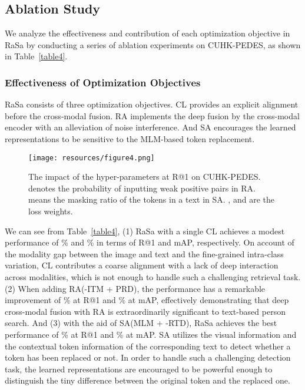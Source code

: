 \documentclass{article}
\begin{document}
\subsection{Ablation Study}


We analyze the effectiveness and contribution of each optimization objective in RaSa by conducting a series of ablation experiments on CUHK-PEDES, as shown in Table~\ref{table4}.


\subsubsection{Effectiveness of Optimization Objectives}
RaSa consists of three optimization objectives. CL provides an explicit alignment before the cross-modal fusion. RA implements the deep fusion by the cross-modal encoder with an alleviation of noise interference. And SA encourages the learned representations to be sensitive to the MLM-based token replacement.

\begin{figure*}[ht]
\setlength{\belowcaptionskip}{0.35cm}
\centering
\texttt{[image: resources/figure4.png]} \caption{The impact of the hyper-parameters at R@1 on CUHK-PEDES.  denotes the probability of inputting weak positive pairs in RA.  means the masking ratio of the tokens in a text in SA. ,  and  are the loss weights.}
\label{fig4}
\end{figure*}

We can see from Table~\ref{table4},
(1) RaSa with a single CL achieves a modest performance of \% and \% in terms of R@1 and mAP, respectively. On account of the modality gap between the image and text and the fine-grained intra-class variation, CL contributes a coarse alignment with a lack of deep interaction across modalities, which is not enough to handle such a challenging retrieval task.
(2) When adding RA(-ITM + PRD), the performance has a remarkable improvement of \% at R@1 and \% at mAP, effectively demonstrating that deep cross-modal fusion with RA is extraordinarily significant to text-based person search.
And (3) with the aid of SA(MLM + -RTD), RaSa achieves the best performance of \% at R@1 and \% at mAP. SA utilizes the visual information and the contextual token information of the corresponding text to detect whether a token has been replaced or not. In order to handle such a challenging detection task, the learned representations are encouraged to be powerful enough to distinguish the tiny difference between the original token and the replaced one.
\end{document}
